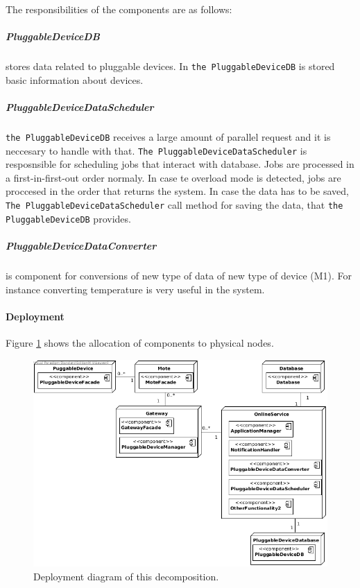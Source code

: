         \noindent The responsibilities of the components are as follows:

    \subparagraph{PluggableDeviceDB}
        stores data related to pluggable devices. In \texttt{the PluggableDeviceDB}
        is stored basic information about devices.

    \subparagraph{PluggableDeviceDataScheduler}
        \texttt{the PluggableDeviceDB} receives a large amount of parallel request
        and it is neccesary to handle with that.
        \texttt{The PluggableDeviceDataScheduler} is resposnsible for scheduling jobs
        that interact with database. Jobs are processed in a first-in-first-out order normaly.
        In case te overload mode is detected, jobs are proccesed in  the  order
        that  returns  the  system. In case the data has to be saved,
        \texttt{The PluggableDeviceDataScheduler} call method for saving the data, that
         \texttt{the PluggableDeviceDB} provides.

    \subparagraph{PluggableDeviceDataConverter}
       is component for conversions of new type of data of new type of device (M1).
       For instance converting temperature is very useful in the system.


    \paragraph{Deployment}
        Figure \ref{fig:it2-depl_main} shows the allocation of components
        to physical nodes.

        \begin{figure}[!h]
        	\centering
        	\includegraphics[width=1\textwidth]{deployment-diagram-2}
        	\caption{Deployment diagram of this decomposition.
        	}\label{fig:it2-depl_main}
        \end{figure}


